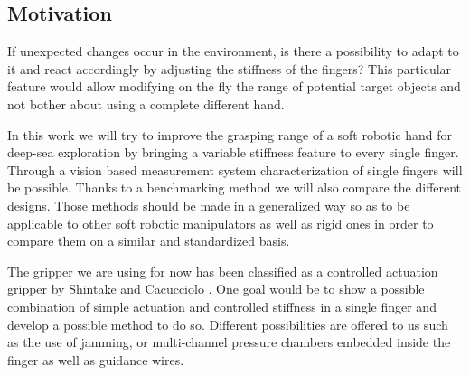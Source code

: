 \subsection{Motivation}
\label{s:Motivation}
If unexpected changes occur in the environment, is there a possibility to adapt to it and react accordingly by adjusting the stiffness of the fingers? This particular feature would allow modifying on the fly the range of potential target objects and not bother about using a complete different hand.

In this work we will try to improve the grasping range of a soft robotic hand for deep-sea exploration by bringing a variable stiffness feature to every single finger. Through a vision based measurement system characterization of single fingers will be possible. Thanks to a benchmarking method we will also compare the different designs. Those methods should be made in a generalized way so as to be applicable to other soft robotic manipulators as well as rigid ones in order to compare them on a similar and standardized basis.

The gripper we are using for now has been classified as a controlled actuation gripper by Shintake and Cacucciolo \cite{shintake2018soft}. One goal would be to show a possible combination of simple actuation and controlled stiffness in a single finger and develop a possible method to do so. Different possibilities are offered to us such as the use of jamming, or multi-channel pressure chambers embedded inside the finger as well as guidance wires. 



